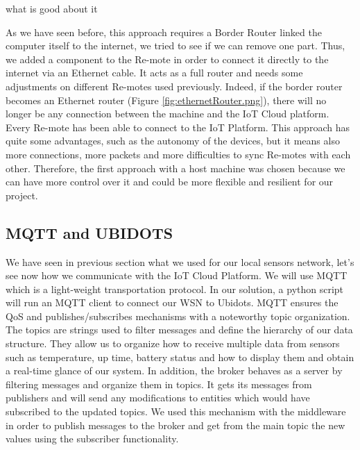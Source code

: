 what is good about it %

As we have seen before,
	this approach requires a Border Router linked the computer itself to the internet,
	we tried to see if we can remove one part.
Thus,
	we added a component to the Re-mote in order to connect it directly to the internet via an Ethernet cable.
It acts as a full router and needs some adjustments on different Re-motes used previously.
Indeed,
	if the border router becomes an Ethernet router (Figure \ref{fig:ethernetRouter.png}),
	there will no longer be any connection between the machine and the IoT Cloud platform.
Every Re-mote has been able to connect to the IoT Platform.
This approach has quite some advantages,
	such as the autonomy of the devices,
	but it means also more connections,
	more packets and more difficulties to sync Re-motes with each other.
Therefore,
	the first approach with a host machine was chosen because we can have more control over it and could be more flexible and resilient for our project.


\subsection{MQTT and UBIDOTS} \label{Sec:MQTT}

We have seen in previous section what we used for our local sensors network,
let's see now how we communicate with the IoT Cloud Platform.
We will use MQTT which is a light-weight transportation protocol.
In our solution,
	a python script will run an MQTT client to connect our WSN to Ubidots.
MQTT ensures the QoS and publishes/subscribes mechanisms with a noteworthy topic organization.
The topics are strings used to filter messages and define the hierarchy of our data structure.
They allow us to organize how to receive multiple data from sensors such as temperature,
	up time,
	battery status and how to display them and obtain a real-time glance of our system.
In addition,
	the broker behaves as a server by filtering messages and organize them in topics.
It gets its messages from publishers and will send any modifications to entities which would have subscribed to the updated topics.
We used this mechanism with the middleware in order to publish messages to the broker and get from the main topic the new values using the subscriber functionality.

